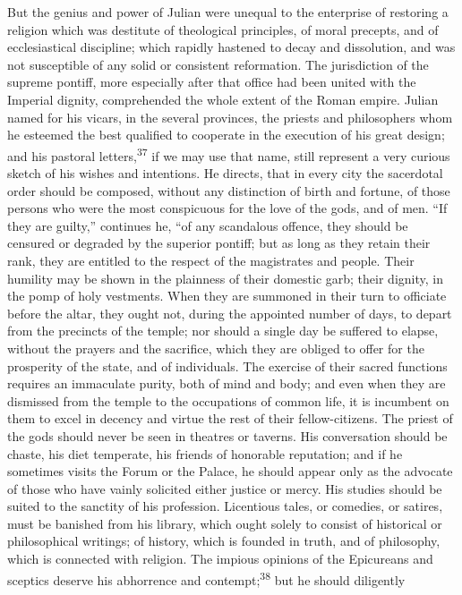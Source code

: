 But the genius and power of Julian were unequal to the enterprise
of restoring a religion which was destitute of theological
principles, of moral precepts, and of ecclesiastical discipline;
which rapidly hastened to decay and dissolution, and was not
susceptible of any solid or consistent reformation. The
jurisdiction of the supreme pontiff, more especially after that
office had been united with the Imperial dignity, comprehended
the whole extent of the Roman empire. Julian named for his
vicars, in the several provinces, the priests and philosophers
whom he esteemed the best qualified to cooperate in the execution
of his great design; and his pastoral letters,\textsuperscript{37} if we may use
that name, still represent a very curious sketch of his wishes
and intentions. He directs, that in every city the sacerdotal
order should be composed, without any distinction of birth and
fortune, of those persons who were the most conspicuous for the
love of the gods, and of men. “If they are guilty,” continues he,
“of any scandalous offence, they should be censured or degraded
by the superior pontiff; but as long as they retain their rank,
they are entitled to the respect of the magistrates and people.
Their humility may be shown in the plainness of their domestic
garb; their dignity, in the pomp of holy vestments. When they are
summoned in their turn to officiate before the altar, they ought
not, during the appointed number of days, to depart from the
precincts of the temple; nor should a single day be suffered to
elapse, without the prayers and the sacrifice, which they are
obliged to offer for the prosperity of the state, and of
individuals. The exercise of their sacred functions requires an
immaculate purity, both of mind and body; and even when they are
dismissed from the temple to the occupations of common life, it
is incumbent on them to excel in decency and virtue the rest of
their fellow-citizens. The priest of the gods should never be
seen in theatres or taverns. His conversation should be chaste,
his diet temperate, his friends of honorable reputation; and if
he sometimes visits the Forum or the Palace, he should appear
only as the advocate of those who have vainly solicited either
justice or mercy. His studies should be suited to the sanctity of
his profession. Licentious tales, or comedies, or satires, must
be banished from his library, which ought solely to consist of
historical or philosophical writings; of history, which is
founded in truth, and of philosophy, which is connected with
religion. The impious opinions of the Epicureans and sceptics
deserve his abhorrence and contempt;\textsuperscript{38} but he should diligently
